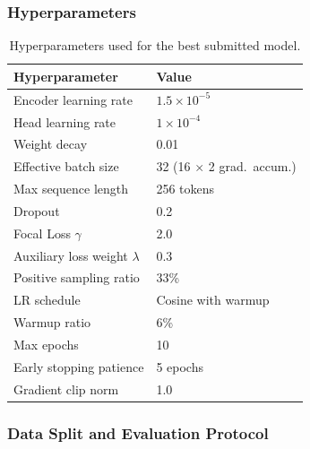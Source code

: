 \documentclass[11pt,a4paper]{article}
\begin{document}
\subsubsection{Hyperparameters}

\begin{table}[H]
    \centering
    \begin{tabular}{ll}
        \toprule
        \textbf{Hyperparameter}         & \textbf{Value}                   \\
        \midrule
        Encoder learning rate           & $1.5 \times 10^{-5}$             \\
        Head learning rate              & $1 \times 10^{-4}$               \\
        Weight decay                    & 0.01                             \\
        Effective batch size            & 32 (16 $\times$ 2 grad.\ accum.) \\
        Max sequence length             & 256 tokens                       \\
        Dropout                         & 0.2                              \\
        Focal Loss $\gamma$             & 2.0                              \\
        Auxiliary loss weight $\lambda$ & 0.3                              \\
        Positive sampling ratio         & 33\%                             \\
        LR schedule                     & Cosine with warmup               \\
        Warmup ratio                    & 6\%                              \\
        Max epochs                      & 10                               \\
        Early stopping patience         & 5 epochs                         \\
        Gradient clip norm              & 1.0                              \\
        \bottomrule
    \end{tabular}
    \caption{Hyperparameters used for the best submitted model.}
    \label{tab:hyperparams}
\end{table}

\subsubsection{Data Split and Evaluation Protocol}
\end{document}
